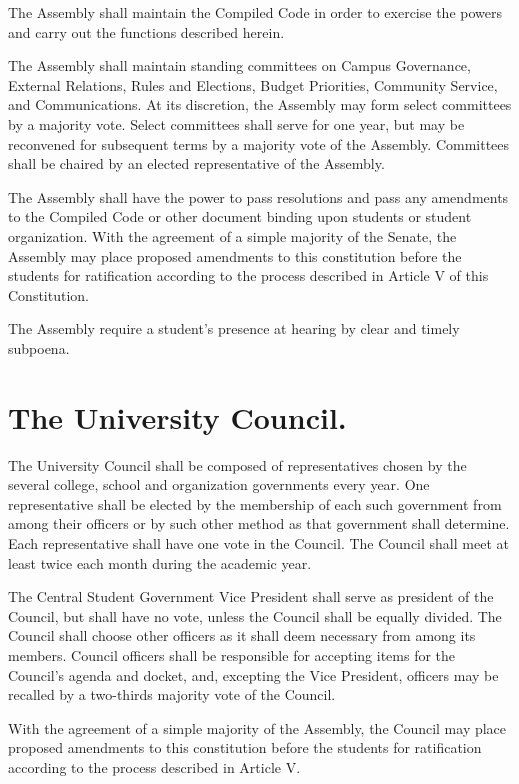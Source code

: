     The Assembly shall maintain the Compiled Code in order to exercise the powers and carry out the functions described herein.

    The Assembly shall maintain standing committees on Campus Governance, External Relations, Rules and Elections, Budget Priorities, Community Service, and Communications. At its discretion, the Assembly may form select committees by a majority vote. Select committees shall serve for one year, but may be reconvened for subsequent terms by a majority vote of the Assembly. Committees shall be chaired by an elected representative of the Assembly.

    The Assembly shall have the power to pass resolutions and pass any amendments to the Compiled Code or other document binding upon students or student organization. With the agreement of a simple majority of the Senate, the Assembly may place proposed amendments to this constitution before the students for ratification according to the process described in Article V of this Constitution.

    The Assembly require a student's presence at hearing by clear and timely subpoena.

\section{The University Council.}
    The University Council shall be composed of representatives chosen by the several college, school and organization governments every year. One representative shall be elected by the membership of each such government from among their officers or by such other method as that government shall determine. Each representative shall have one vote in the Council. The Council shall meet at least twice each month during the academic year.

    The Central Student Government Vice President shall serve as president of the Council, but shall have no vote, unless the Council shall be equally divided. The Council shall choose other officers as it shall deem necessary from among its members. Council officers shall be responsible for accepting items for the Council's agenda and docket, and, excepting the Vice President, officers may be recalled by a two-thirds majority vote of the Council.
  
    With the agreement of a simple majority of the Assembly, the Council may place proposed amendments to this constitution before the students for ratification according to the process described in Article V.

